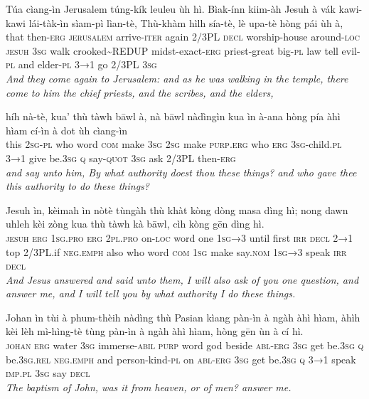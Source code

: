 \documentclass[11pt,a4paper]{article}
\begin{document}
\begin{exe}
\gll Túa cìang-ìn Jerusalem túng-kík leuleu ùh hì. Bìak-ínn kiim-àh Jesuh à vák kawi-kawi lái-tàk-ìn sìam-pì lìan-tè, Thù-khàm hìlh sía-tè, lè upa-tè hòng pái ùh à, \\
     that then-\textsc{erg} \textsc{jerusalem} arrive-\textsc{iter} again 2/3PL \textsc{decl} worship-house around-\textsc{loc} \textsc{jesuh} \textsc{3sg} walk crooked\textasciitilde{}REDUP midst-exact-\textsc{erg} priest-great big-\textsc{pl} law tell evil-\textsc{pl} and elder-\textsc{pl} \textsc{3→1} go 2/3PL \textsc{3sg} \\
\glt \textcolor{kjvcolor}{\textit{And they come again to Jerusalem: and as he was walking in the temple, there come to him the chief priests, and the scribes, and the elders,}}

\gll híh nà-tè, kua' thù tàwh bāwl à, nà bāwl nàdìngìn kua ìn à-ana hòng pía àhì hìam cí-ìn à dot ùh cìang-ìn \\
     this \textsc{2sg}-\textsc{pl} who word \textsc{com} make \textsc{3sg} \textsc{2sg} make \textsc{purp}.\textsc{erg} who \textsc{erg} \textsc{3sg}-child.\textsc{pl} \textsc{3→1} give be.\textsc{3sg} \textsc{q} say-\textsc{quot} \textsc{3sg} ask 2/3PL then-\textsc{erg} \\
\glt \textcolor{kjvcolor}{\textit{and say unto him, By what authority doest thou these things? and who gave thee this authority to do these things?}}

\gll Jesuh ìn, kèimah ìn nòtè tùngàh thù khàt kòng dòng masa dìng hì; nong dawn uhleh kèi zòng kua thù tàwh kà bāwl, cìh kòng gēn dìng hì. \\
     \textsc{jesuh} \textsc{erg} \textsc{1sg}.\textsc{pro} \textsc{erg} \textsc{2pl}.\textsc{pro} on-\textsc{loc} word one \textsc{1sg→3} until first \textsc{irr} \textsc{decl} \textsc{2→1} top 2/3PL.if \textsc{neg}.\textsc{emph} also who word \textsc{com} \textsc{1sg} make say.\textsc{nom} \textsc{1sg→3} speak \textsc{irr} \textsc{decl} \\
\glt \textcolor{kjvcolor}{\textit{And Jesus answered and said unto them, I will also ask of you one question, and answer me, and I will tell you by what authority I do these things.}}

\gll Johan ìn tùi à phum-thèih nàdìng thù Pasian kìang pàn-ìn à ngàh àhì hìam, àhìh kèi lèh mì-hìng-tè tùng pàn-ìn à ngàh àhì hìam, hòng gēn ùn à cí hì. \\
     \textsc{johan} \textsc{erg} water \textsc{3sg} immerse-\textsc{abil} \textsc{purp} word god beside \textsc{abl}-\textsc{erg} \textsc{3sg} get be.\textsc{3sg} \textsc{q} be.\textsc{3sg}.\textsc{rel} \textsc{neg}.\textsc{emph} and person-kind-\textsc{pl} on \textsc{abl}-\textsc{erg} \textsc{3sg} get be.\textsc{3sg} \textsc{q} \textsc{3→1} speak \textsc{imp}.\textsc{pl} \textsc{3sg} say \textsc{decl} \\
\glt \textcolor{kjvcolor}{\textit{The baptism of John, was it from heaven, or of men? answer me.}}


\end{exe}
\end{document}
